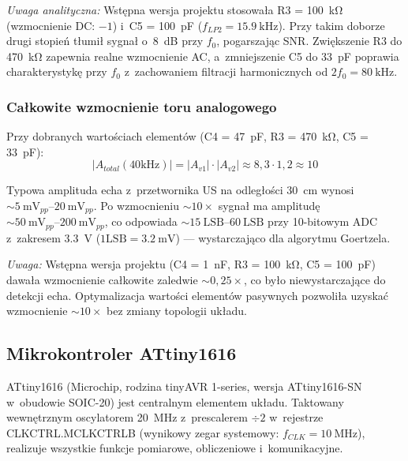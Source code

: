 \documentclass[a4paper,11pt]{article}
\begin{document}
\textit{Uwaga analityczna:} Wstępna wersja projektu stosowała R3 = \SI{100}{\kilo\ohm}
(wzmocnienie DC: $-1$) i~C5 = \SI{100}{\pico\farad} ($f_{LP2} = \SI{15,9}{\kilo\hertz}$).
Przy takim doborze drugi stopień tłumił sygnał o~\SI{8}{\deci\bel} przy $f_0$,
pogarszając SNR. Zwiększenie R3 do \SI{470}{\kilo\ohm} zapewnia realne
wzmocnienie AC, a~zmniejszenie C5 do \SI{33}{\pico\farad} poprawia
charakterystykę przy $f_0$ z~zachowaniem filtracji harmonicznych
od $2f_0 = \SI{80}{\kilo\hertz}$.

\subsubsection{Całkowite wzmocnienie toru analogowego}

Przy dobranych wartościach elementów (C4 = \SI{47}{\pico\farad}, R3 = \SI{470}{\kilo\ohm},
C5 = \SI{33}{\pico\farad}):
\begin{equation}
    |A_{total}(40\text{kHz})| = |A_{v1}| \cdot |A_{v2}| \approx 8{,}3 \cdot 1{,}2 \approx 10
    \label{eq:gain_total_current}
\end{equation}

Typowa amplituda echa z~przetwornika US na odległości \SI{30}{\centi\metre}
wynosi ${\sim}\SIrange{5}{20}{\milli\volt_{pp}}$. Po wzmocnieniu ${\sim}10\times$
sygnał ma amplitudę ${\sim}\SIrange{50}{200}{\milli\volt_{pp}}$, co odpowiada
${\sim}\SIrange{15}{60}{\text{LSB}}$ przy 10-bitowym ADC z~zakresem \SI{3,3}{\volt}
($1\text{LSB} = \SI{3,2}{\milli\volt}$) --- wystarczająco dla algorytmu
Goertzela.

\textit{Uwaga:} Wstępna wersja projektu (C4 = \SI{1}{\nano\farad}, R3 = \SI{100}{\kilo\ohm},
C5 = \SI{100}{\pico\farad}) dawała wzmocnienie całkowite zaledwie ${\sim}0{,}25\times$,
co było niewystarczające do detekcji echa. Optymalizacja wartości elementów
pasywnych pozwoliła uzyskać wzmocnienie ${\sim}10\times$ bez zmiany topologii
układu.

\subsection{Mikrokontroler ATtiny1616}
\label{sec:mcu}

ATtiny1616 (Microchip, rodzina tinyAVR 1-series, wersja ATtiny1616-SN
w~obudowie SOIC-20) jest centralnym elementem
układu. Taktowany wewnętrznym oscylatorem \SI{20}{\mega\hertz} z~prescalerem
$\div 2$ w~rejestrze CLKCTRL.MCLKCTRLB (wynikowy zegar systemowy:
$f_{CLK} = \SI{10}{\mega\hertz}$), realizuje wszystkie funkcje pomiarowe,
obliczeniowe i~komunikacyjne.
\end{document}
